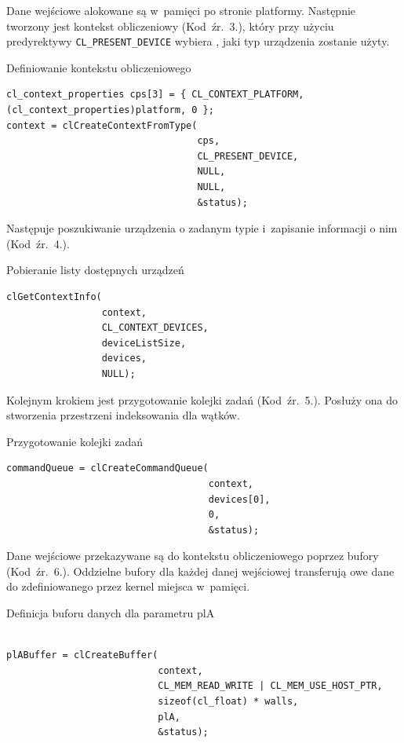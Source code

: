 Dane wejściowe alokowane są w~pamięci po stronie platformy. Następnie tworzony jest kontekst obliczeniowy (Kod~źr.~3.), który przy użyciu predyrektywy \verb|CL_PRESENT_DEVICE| wybiera , jaki typ urządzenia zostanie użyty.

\begin{program}[H]
\caption{Definiowanie kontekstu obliczeniowego}
\begin{lstlisting}
cl_context_properties cps[3] = { CL_CONTEXT_PLATFORM, (cl_context_properties)platform, 0 };
context = clCreateContextFromType(
                                  cps, 
                                  CL_PRESENT_DEVICE, 
                                  NULL, 
                                  NULL, 
                                  &status);
\end{lstlisting}
\end{program}

Następuje poszukiwanie urządzenia o zadanym typie i~zapisanie informacji o nim (Kod~źr.~4.).

\begin{program}[H]
\caption{Pobieranie listy dostępnych urządzeń}
\begin{lstlisting}
clGetContextInfo(
                 context, 
                 CL_CONTEXT_DEVICES, 
                 deviceListSize, 
                 devices, 
                 NULL);

\end{lstlisting}
\end{program}

Kolejnym krokiem jest przygotowanie kolejki zadań (Kod~źr.~5.). Posłuży ona do stworzenia przestrzeni indeksowania dla wątków.

\begin{program}[H]
\caption{Przygotowanie kolejki zadań}
\begin{lstlisting}
commandQueue = clCreateCommandQueue(
                                    context, 
                                    devices[0], 
                                    0, 
                                    &status);
\end{lstlisting}
\end{program}

Dane wejściowe przekazywane są do kontekstu obliczeniowego poprzez bufory (Kod~źr.~6.). Oddzielne bufory dla każdej danej wejściowej transferują owe  dane do zdefiniowanego przez kernel miejsca w~pamięci. 

\begin{program}[H]
\caption{Definicja buforu danych dla parametru plA}
\begin{lstlisting}

plABuffer = clCreateBuffer(
                           context, 
                           CL_MEM_READ_WRITE | CL_MEM_USE_HOST_PTR,
                           sizeof(cl_float) * walls,
                           plA, 
                           &status);
\end{lstlisting}
\end{program}


